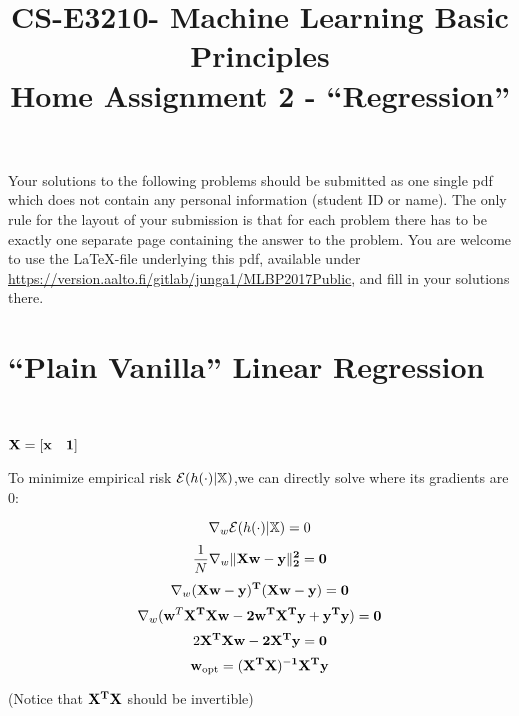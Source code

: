 \documentclass[article,11pt]{article}
\title{CS-E3210- Machine Learning Basic Principles \\ Home Assignment 2 - ``Regression''}
\begin{document}
\date{}
\maketitle

Your solutions to the following problems should be submitted as one single pdf which does not contain 
any personal information (student ID or name). The only rule for the layout of your submission is that for each 
problem there has to be exactly one separate page containing the answer to the problem. You are welcome to use the \LaTeX-file underlying this pdf, 
available under \url{https://version.aalto.fi/gitlab/junga1/MLBP2017Public}, and fill in your solutions there. 

\newpage
\section{``Plain Vanilla'' Linear Regression}
\label{problem_1}
\\

\begin{center}
	$\bf{X}=\left[ {\bf x} \quad 1\right] $\\
\end{center}
To minimize empirical risk $\mathcal{E}(h(\cdot) | \mathbb{X})$,we can directly solve
where its gradients are 0:

\begin{equation}
\nabla_{w}\mathcal{E}(h(\cdot) | \mathbb{X})=0
\end{equation}
\begin{equation}
	\frac{1}{N}\nabla_{w}\lVert \bf{X} {\bf w}-{\bf y} \rVert_{2}^{2}=0
\end{equation}
\begin{equation}
	\nabla_{w}(\bf{X}{\bf w}-{\bf y})^{T}(\bf{X}{\bf w}-{\bf y})=0
\end{equation}
\begin{equation}
\nabla_{w}({\bf w}^{T}\bf{X}^{T}\bf{X}{\bf w}-2{\bf w}^{T}\bf{X}^{T}{\bf y}+{\bf y}^{T}{\bf y})=0
\end{equation}
\begin{equation}
2\bf{X}^{T}\bf{X}{\bf w}-2\bf{X}^{T}{\bf y}=0
\end{equation}
\begin{equation}
	{\bf w}_{\rm opt}=(\bf{X}^{T}\bf{X})^{-1}\bf{X}^{T}{\bf y}
\end{equation}
\begin{center}
	(Notice that $\bf{X}^{T}\bf{X}$ should be invertible)
\end{center}
\end{document}
